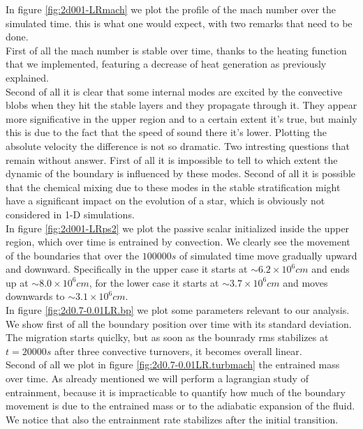In figure \ref{fig:2d001-LRmach} we plot the profile of the mach number over the simulated time. this is what one would expect, with two remarks that need to be done. \\
First of all the mach number is stable over time, thanks to the heating function that we implemented, featuring a decrease of heat generation as previously explained. \\
Second of all it is clear that some internal modes are excited by the convective blobs when they hit the stable layers and they propagate through it. They appear more significative in the upper region and to a certain extent it's true, but mainly this is due to the fact that the speed of sound there it's lower. Plotting the absolute velocity the difference is not so dramatic. Two intresting questions that remain without answer. First of all it is impossible to tell to which extent the dynamic of the boundary is influenced by these modes. Second of all it is possible that the chemical mixing due to these modes in the stable stratification might have a significant impact on the evolution of a star, which is obviously not considered in 1-D simulations.\\
In figure \ref{fig:2d001-LRps2} we plot the passive scalar initialized inside the upper region, which over time is entrained by convection. We clearly see the movement of the boundaries that over the $100000 s$ of simulated time move gradually upward and downward. Specifically in the upper case it starts at $\sim 6.2 \times 10^{6} cm $ and ends up at $\sim 8.0 \times 10^{6} cm$, for the lower case it starts at $\sim 3.7 \times 10^{6} cm$ and moves downwards to $\sim 3.1 \times 10^{6} cm$. \\
In figure \ref{fig:2d0.7-0.01LR.bp} we plot some parameters relevant to our analysis. \\
We show first of all the boundary position over time with its standard deviation. The migration starts quiclky, but as soon as the bounrady rms stabilizes at $t=20000 s$ after three convective turnovers, it becomes overall linear. \\
Second of all we plot in figure \ref{fig:2d0.7-0.01LR.turbmach} the entrained mass over time. As already mentioned we will perform a lagrangian study of entrainment, because it is impracticable to quantify how much of the boundary movement is due to the entrained mass or to the adiabatic expansion of the fluid. \\ We notice that also the entrainment rate stabilizes after the initial transition.
